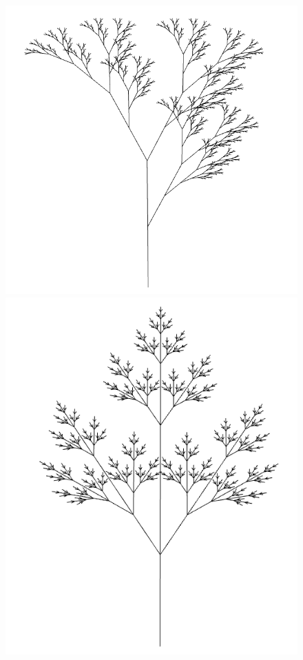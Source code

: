 \documentclass[a4paper,10pt]{report}
\begin{document}
\begin{figure}[h!]
\centering
\begin{minipage}{.3\textwidth}
  \centering
  \includegraphics[width=.9\linewidth]{Images/Sprint-Images/tree1.png}
    \end{minipage}%
\begin{minipage}{.3\textwidth}
  \centering
  \includegraphics[width=.9\linewidth]{Images/Sprint-Images/tree2.png}

\end{minipage}
\end{figure}
\end{document}
